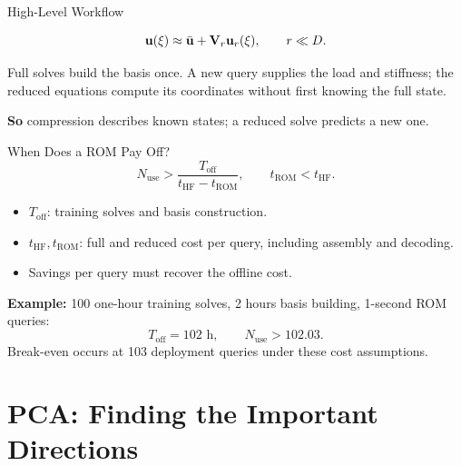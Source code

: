 \documentclass[10pt,aspectratio=169]{ntuabeamer}
\newcommand{\takeaway}[1]{\par\vspace{0.7em}\textcolor{ntuablue}{\textbf{So} #1}\par}
\begin{document}
\begin{frame}{High-Level Workflow}
\centering
{}
\[
 \mathbf{u}(\xi)\approx\bar{\mathbf{u}}+\mathbf{V}_r\mathbf{u}_r(\xi),\qquad r\ll D.
\]
\raggedright\small
Full solves build the basis once. A new query supplies the load and stiffness;
the reduced equations compute its coordinates without first knowing the full state.
\takeaway{compression describes known states; a reduced solve predicts a new one.}
\end{frame}

\begin{frame}{When Does a ROM Pay Off?}
\small
\[
 N_{\mathrm{use}}>\frac{T_{\mathrm{off}}}{t_{\mathrm{HF}}-t_{\mathrm{ROM}}},\qquad
 t_{\mathrm{ROM}}<t_{\mathrm{HF}}.
\]
\begin{itemize}
\item $T_{\mathrm{off}}$: training solves and basis construction.
\item $t_{\mathrm{HF}},t_{\mathrm{ROM}}$: full and reduced cost per query, including assembly and decoding.
\item Savings per query must recover the offline cost.
\end{itemize}
\textbf{Example:} 100 one-hour training solves, 2 hours basis building, 1-second ROM queries:
\[
 T_{\mathrm{off}}=102\text{ h},\qquad N_{\mathrm{use}}>102.03.
\]
Break-even occurs at 103 deployment queries under these cost assumptions.
\end{frame}

\section{PCA: Finding the Important Directions}
\end{document}
